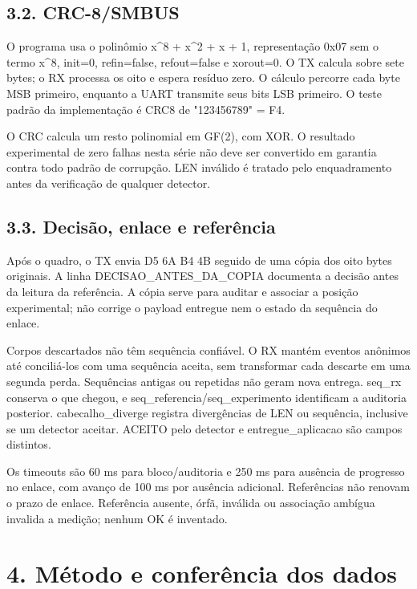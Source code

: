 \documentclass[11pt,a4paper]{article}
\begin{document}
\subsection*{3.2. CRC-8/SMBUS}

O programa usa o polinômio x\textasciicircum{}8 + x\textasciicircum{}2 + x + 1, representação 0x07 sem o termo x\textasciicircum{}8, init=0, refin=false, refout=false e xorout=0. O TX calcula sobre sete bytes; o RX processa os oito e espera resíduo zero. O cálculo percorre cada byte MSB primeiro, enquanto a UART transmite seus bits LSB primeiro. O teste padrão da implementação é CRC8 de "123456789" = F4.


O CRC calcula um resto polinomial em GF(2), com XOR. O resultado experimental de zero falhas nesta série não deve ser convertido em garantia contra todo padrão de corrupção. LEN inválido é tratado pelo enquadramento antes da verificação de qualquer detector.


\subsection*{3.3. Decisão, enlace e referência}

Após o quadro, o TX envia D5 6A B4 4B seguido de uma cópia dos oito bytes originais. A linha DECISAO\_ANTES\_DA\_COPIA documenta a decisão antes da leitura da referência. A cópia serve para auditar e associar a posição experimental; não corrige o payload entregue nem o estado da sequência do enlace.


Corpos descartados não têm sequência confiável. O RX mantém eventos anônimos até conciliá-los com uma sequência aceita, sem transformar cada descarte em uma segunda perda. Sequências antigas ou repetidas não geram nova entrega. seq\_rx conserva o que chegou, e seq\_referencia/seq\_experimento identificam a auditoria posterior. cabecalho\_diverge registra divergências de LEN ou sequência, inclusive se um detector aceitar. ACEITO pelo detector e entregue\_aplicacao são campos distintos.


Os timeouts são 60 ms para bloco/auditoria e 250 ms para ausência de progresso no enlace, com avanço de 100 ms por ausência adicional. Referências não renovam o prazo de enlace. Referência ausente, órfã, inválida ou associação ambígua invalida a medição; nenhum OK é inventado.


\section*{4. Método e conferência dos dados}
\end{document}
